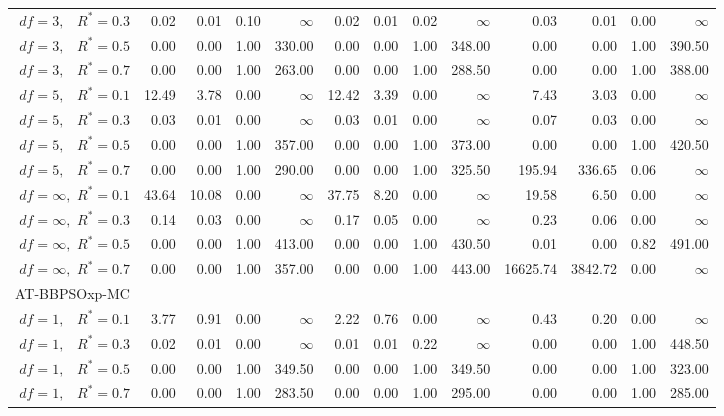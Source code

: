 \documentclass[12pt]{article}
\begin{document}
\begin{table}[ht]
{\begin{tabular}{r|rrrr|rrrr|rrrr}
  $df = 3,\enspace$ $R^* =0.3$ & 0.02 & 0.01 & 0.10 & $\infty$ & 0.02 & 0.01 & 0.02 & $\infty$ & 0.03 & 0.01 & 0.00 & $\infty$ \\ 
  $df = 3,\enspace$ $R^* =0.5$ & 0.00 & 0.00 & 1.00 & 330.00 & 0.00 & 0.00 & 1.00 & 348.00 & 0.00 & 0.00 & 1.00 & 390.50 \\ 
  $df = 3,\enspace$ $R^* =0.7$ & 0.00 & 0.00 & 1.00 & 263.00 & 0.00 & 0.00 & 1.00 & 288.50 & 0.00 & 0.00 & 1.00 & 388.00 \\ 
  $df = 5,\enspace$ $R^* =0.1$ & 12.49 & 3.78 & 0.00 & $\infty$ & 12.42 & 3.39 & 0.00 & $\infty$ & 7.43 & 3.03 & 0.00 & $\infty$ \\ 
  $df = 5,\enspace$ $R^* =0.3$ & 0.03 & 0.01 & 0.00 & $\infty$ & 0.03 & 0.01 & 0.00 & $\infty$ & 0.07 & 0.03 & 0.00 & $\infty$ \\ 
  $df = 5,\enspace$ $R^* =0.5$ & 0.00 & 0.00 & 1.00 & 357.00 & 0.00 & 0.00 & 1.00 & 373.00 & 0.00 & 0.00 & 1.00 & 420.50 \\ 
  $df = 5,\enspace$ $R^* =0.7$ & 0.00 & 0.00 & 1.00 & 290.00 & 0.00 & 0.00 & 1.00 & 325.50 & 195.94 & 336.65 & 0.06 & $\infty$ \\ 
  $df = \infty,$ $R^* =0.1$ & 43.64 & 10.08 & 0.00 & $\infty$ & 37.75 & 8.20 & 0.00 & $\infty$ & 19.58 & 6.50 & 0.00 & $\infty$ \\ 
  $df = \infty,$ $R^* =0.3$ & 0.14 & 0.03 & 0.00 & $\infty$ & 0.17 & 0.05 & 0.00 & $\infty$ & 0.23 & 0.06 & 0.00 & $\infty$ \\ 
  $df = \infty,$ $R^* =0.5$ & 0.00 & 0.00 & 1.00 & 413.00 & 0.00 & 0.00 & 1.00 & 430.50 & 0.01 & 0.00 & 0.82 & 491.00 \\ 
  $df = \infty,$ $R^* =0.7$ & 0.00 & 0.00 & 1.00 & 357.00 & 0.00 & 0.00 & 1.00 & 443.00 & 16625.74 & 3842.72 & 0.00 & $\infty$ \\ 
\hline
\multicolumn{1}{l|}{AT-BBPSOxp-MC} &&&&&&&&&&&&\\
  $df = 1,\enspace$ $R^* =0.1$ & 3.77 & 0.91 & 0.00 & $\infty$ & 2.22 & 0.76 & 0.00 & $\infty$ & 0.43 & 0.20 & 0.00 & $\infty$ \\ 
  $df = 1,\enspace$ $R^* =0.3$ & 0.02 & 0.01 & 0.00 & $\infty$ & 0.01 & 0.01 & 0.22 & $\infty$ & 0.00 & 0.00 & 1.00 & 448.50 \\ 
  $df = 1,\enspace$ $R^* =0.5$ & 0.00 & 0.00 & 1.00 & 349.50 & 0.00 & 0.00 & 1.00 & 349.50 & 0.00 & 0.00 & 1.00 & 323.00 \\ 
  $df = 1,\enspace$ $R^* =0.7$ & 0.00 & 0.00 & 1.00 & 283.50 & 0.00 & 0.00 & 1.00 & 295.00 & 0.00 & 0.00 & 1.00 & 285.00 \\ 

\end{tabular}}
\end{table}
\end{document}

